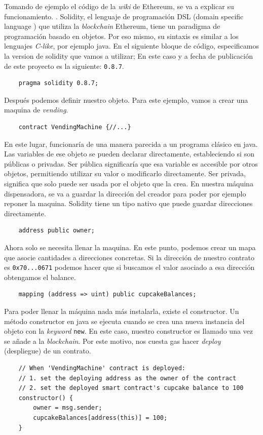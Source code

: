 Tomando de ejemplo el código de la \textit{wiki} de Ethereum, se va a explicar su funcionamiento. \cite{web:sample_smart_contract}.
Solidity, el lenguaje de programación DSL (domain specific language \cite{web:DSL}) que utiliza la \textit{blockchain} Ethereum, tiene un paradigma de programación basado en objetos. Por eso mismo, su sintaxis es similar a los lenguajes \textit{C-like}, por ejemplo java.
En el siguiente bloque de código, especificamos la version de solidity que vamos a utilizar; En este caso y a fecha de publicación de este proyecto es la siguiente: \verb|0.8.7|.
\begin{lstlisting}
    pragma solidity 0.8.7;
\end{lstlisting}
Después podemos definir nuestro objeto. Para este ejemplo, vamos a crear una maquina de \textit{vending}.
\begin{lstlisting}
    contract VendingMachine {//...}
\end{lstlisting}
En este lugar, funcionaría de una manera parecida a un programa clásico en java. Las variables de ese objeto se pueden declarar directamente, estableciendo si son públicas o privadas. Ser pública significaría que esa variable es accesible por otros objetos, permitiendo utilizar su valor o modificarlo directamente. Ser privada, significa que solo puede ser usada por el objeto que la crea.
En nuestra máquina dispensadora, se va  a guardar la dirección del creador para poder por ejemplo reponer la maquina. Solidity tiene un tipo nativo que puede guardar direcciones directamente.
\begin{lstlisting}
    address public owner;
\end{lstlisting}
Ahora solo se necesita llenar la maquina. En este punto, podemos crear un mapa que asocie cantidades a direcciones concretas.
Si la dirección de nuestro contrato es \verb|0x70...0671| podemos hacer que si buscamos el valor asociado a esa dirección obtengamos el balance.
\begin{lstlisting}
    mapping (address => uint) public cupcakeBalances;
\end{lstlisting}
Para poder llenar la máquina nada más instalarla, existe el constructor. Un método constructor en java se ejecuta cuando se crea una nueva instancia del objeto con la \textit{keyword} \verb|new|. En este caso, nuestro constructor es llamado una vez se añade a la \textit{blockchain}. Por este motivo, nos cuesta gas hacer \textit{deploy} (despliegue) de un contrato.
\begin{lstlisting}
    // When 'VendingMachine' contract is deployed:
    // 1. set the deploying address as the owner of the contract
    // 2. set the deployed smart contract's cupcake balance to 100
    constructor() {
        owner = msg.sender;
        cupcakeBalances[address(this)] = 100;
    }
\end{lstlisting}
